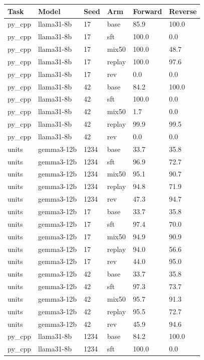 \begin{table}[t]
\centering\small
\begin{tabular}{llllll}
\toprule
Task & Model & Seed & Arm & Forward & Reverse \\
\midrule
py\_cpp & llama31-8b & 17 & base & 85.9 & 100.0 \\
py\_cpp & llama31-8b & 17 & sft & 100.0 & 0.0 \\
py\_cpp & llama31-8b & 17 & mix50 & 100.0 & 48.7 \\
py\_cpp & llama31-8b & 17 & replay & 100.0 & 97.6 \\
py\_cpp & llama31-8b & 17 & rev & 0.0 & 0.0 \\
py\_cpp & llama31-8b & 42 & base & 84.2 & 100.0 \\
py\_cpp & llama31-8b & 42 & sft & 100.0 & 0.0 \\
py\_cpp & llama31-8b & 42 & mix50 & 1.7 & 0.0 \\
py\_cpp & llama31-8b & 42 & replay & 99.9 & 99.5 \\
py\_cpp & llama31-8b & 42 & rev & 0.0 & 0.0 \\
units & gemma3-12b & 1234 & base & 33.7 & 35.8 \\
units & gemma3-12b & 1234 & sft & 96.9 & 72.7 \\
units & gemma3-12b & 1234 & mix50 & 95.1 & 90.7 \\
units & gemma3-12b & 1234 & replay & 94.8 & 71.9 \\
units & gemma3-12b & 1234 & rev & 47.3 & 94.7 \\
units & gemma3-12b & 17 & base & 33.7 & 35.8 \\
units & gemma3-12b & 17 & sft & 97.4 & 70.0 \\
units & gemma3-12b & 17 & mix50 & 94.9 & 90.9 \\
units & gemma3-12b & 17 & replay & 94.0 & 56.6 \\
units & gemma3-12b & 17 & rev & 44.0 & 95.0 \\
units & gemma3-12b & 42 & base & 33.7 & 35.8 \\
units & gemma3-12b & 42 & sft & 97.3 & 73.7 \\
units & gemma3-12b & 42 & mix50 & 95.7 & 91.3 \\
units & gemma3-12b & 42 & replay & 95.5 & 72.7 \\
units & gemma3-12b & 42 & rev & 45.9 & 94.6 \\
py\_cpp & llama31-8b & 1234 & base & 84.2 & 100.0 \\
py\_cpp & llama31-8b & 1234 & sft & 100.0 & 0.0 \\

\end{tabular}
\end{table}
